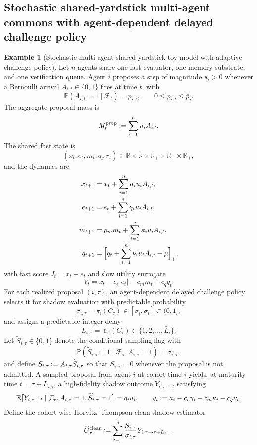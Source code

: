 \documentclass[11pt]{article}
\theoremstyle{definition}
\newtheorem{example}[theorem]{Example}
\newcommand{\R}{\mathbb{R}}
\newcommand{\E}{\mathbb{E}}
\newcommand{\Prob}{\mathbb{P}}
\newcommand{\1}{\mathbf{1}}
\newcommand{\abs}[1]{\left\lvert #1 \right\rvert}
\newcommand{\Defeq}{\vcentcolon=}
\begin{document}
\subsection{Stochastic shared-yardstick multi-agent commons with agent-dependent delayed challenge policy}
\begin{example}[Stochastic multi-agent shared-yardstick toy model with adaptive challenge policy]\label{ex:toy_multi}
Let $n$ agents share one fast evaluator, one memory substrate, and one verification queue. Agent $i$ proposes a step of magnitude $u_i>0$ whenever a Bernoulli arrival $A_{i,t}\in\{0,1\}$ fires at time $t$, with
\[
\Prob(A_{i,t}=1\mid \mathcal F_t)=p_{i,t},
\qquad
0\le p_{i,t}\le \bar p_i.
\]
The aggregate proposal mass is
\[
M_t^{\mathrm{prop}}\Defeq \sum_{i=1}^n u_i A_{i,t}.
\]
The shared fast state is
\[
(x_t,e_t,m_t,q_t,r_t)\in\R\times\R\times\R_+\times\R_+\times\R_+,
\]
and the dynamics are
\begin{align}
  x_{t+1} &= x_t + \sum_{i=1}^n a_i u_i A_{i,t}, \\
  e_{t+1} &= e_t + \sum_{i=1}^n \gamma_i u_i A_{i,t}, \\
  m_{t+1} &= \rho_m m_t + \sum_{i=1}^n \kappa_i u_i A_{i,t}, \\
  q_{t+1} &= \Bigl[q_t + \sum_{i=1}^n \nu_i u_i A_{i,t} - \mu\Bigr]_+,
\end{align}
with fast score $J_t=x_t+e_t$ and slow utility surrogate
\[
V_t = x_t - c_e\abs{e_t} - c_m m_t - c_q q_t.
\]
For each realized proposal $(i,\tau)$, an agent-dependent delayed challenge policy selects it for shadow evaluation with predictable probability
\[
\sigma_{i,\tau}=\pi_i(C_\tau)\in[\underline\sigma_i,\bar\sigma_i]\subset(0,1],
\]
and assigns a predictable integer delay
\[
L_{i,\tau}=\ell_i(C_\tau)\in\{1,2,\dots,\bar L_i\}.
\]
Let $\widetilde S_{i,\tau}\in\{0,1\}$ denote the conditional sampling flag with
\[
\Prob(\widetilde S_{i,\tau}=1\mid \mathcal F_\tau,A_{i,\tau}=1)=\sigma_{i,\tau},
\]
and define $S_{i,\tau}\Defeq A_{i,\tau}\widetilde S_{i,\tau}$ so that $S_{i,\tau}=0$ whenever the proposal is not admitted. A sampled proposal from agent $i$ at cohort time $\tau$ yields, at maturity time $t=\tau+L_{i,\tau}$, a high-fidelity shadow outcome $Y_{i,\tau\to t}$ satisfying
\[
\E\bigl[Y_{i,\tau\to t}\mid \mathcal F_\tau, A_{i,\tau}=1,\widetilde S_{i,\tau}=1\bigr] = g_i u_i,
\qquad
g_i\Defeq a_i-c_e\gamma_i-c_m\kappa_i-c_q\nu_i.
\]
Define the cohort-wise Horvitz--Thompson clean-shadow estimator \cite{HorvitzThompson1952}
\[
\widehat G_\tau^{\mathrm{clean}}\Defeq \sum_{i=1}^n \frac{S_{i,\tau}}{\sigma_{i,\tau}}Y_{i,\tau\to \tau+L_{i,\tau}}.
\]
\end{example}
\end{document}
